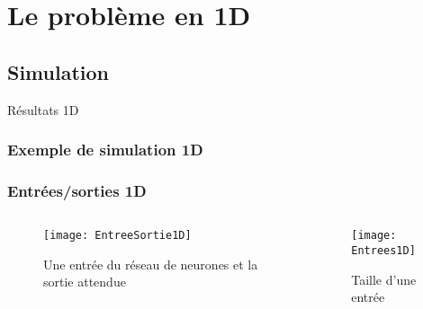 

% 

\section{Le problème en 1D}

\subsection{Simulation}
\begin{frame}
    \large
    \centering
    Résultats 1D
\end{frame}

\begin{frame}[fragile]
    \frametitle{Exemple de simulation 1D}
  \begin{center}
  \end{center}
\end{frame}

\begin{frame}[fragile]
    \frametitle{Entrées/sorties 1D}

    \begin{columns}
    \begin{column}{0.7\textwidth}
        \begin{figure}
        \texttt{[image: EntreeSortie1D]}       
        \caption{Une entrée du réseau de neurones et la sortie attendue}
        \end{figure}
     \end{column}
     \begin{column}{0.3\textwidth}
        \begin{figure}
        \texttt{[image: Entrees1D]}       
        \caption{Taille d'une entrée}
        \end{figure}
     \end{column}
    \end{columns}

\end{frame}

